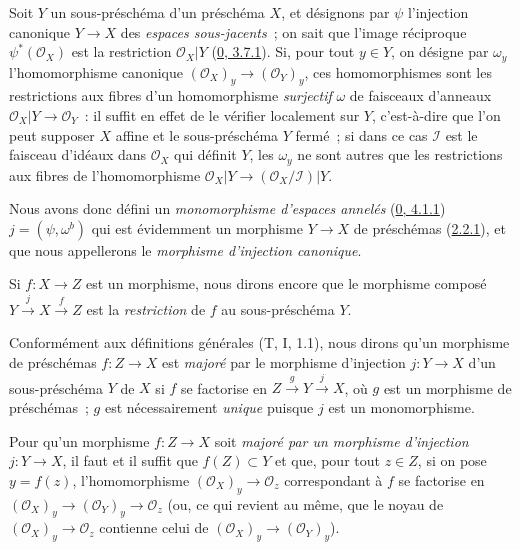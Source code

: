 \begin{env}[4.1.7]
\label{I.4.1.7-fr}
Soit $Y$ un sous-préschéma d'un préschéma $X$, et désignons par $\psi$
l'injection canonique $Y\to X$ des \emph{espaces sous-jacents}~; on sait que
l'image réciproque $\psi^*(\mathscr{O}_X)$ est la restriction
$\mathscr{O}_X|Y$ (\hyperref[0.3.7.1-fr]{0, 3.7.1}). Si, pour tout $y\in Y$,
on désigne par $\omega_y$ l'homomorphisme canonique
$(\mathscr{O}_X)_y\to(\mathscr{O}_Y)_y$, ces homomorphismes sont les
restrictions aux fibres d'un homomorphisme \emph{surjectif} $\omega$ de
faisceaux d'anneaux $\mathscr{O}_X|Y\to\mathscr{O}_Y$~: il suffit en effet de
le vérifier localement sur $Y$, c'est-à-dire que l'on peut supposer $X$
affine et le sous-préschéma $Y$ fermé~; si dans ce cas $\mathscr{I}$ est le
faisceau d'idéaux dans $\mathscr{O}_X$ qui définit $Y$, les $\omega_y$ ne sont
autres que les restrictions aux fibres de l'homomorphisme
$\mathscr{O}_X|Y\to(\mathscr{O}_X/\mathscr{I})|Y$.

Nous avons donc défini un \emph{monomorphisme d'espaces annelés}
(\hyperref[0.4.1.1-fr]{0, 4.1.1}) $j=(\psi,\omega^b)$ qui est évidemment un
morphisme $Y\to X$ de préschémas (\hyperref[I.2.2.1-fr]{2.2.1}), et que nous
appellerons le \emph{morphisme d'injection canonique}.

Si $f:X\to Z$ est un morphisme, nous dirons encore que le morphisme composé
$Y\xrightarrow{j}X\xrightarrow{f}Z$ est la \emph{restriction} de $f$ au
sous-préschéma $Y$.
\end{env}

\begin{env}[4.1.8]
\label{I.4.1.8-fr}
Conformément aux définitions générales (T, I, 1.1), nous dirons qu'un
morphisme de préschémas $f:Z\to X$ est \emph{majoré} par le morphisme
d'injection $j:Y\to X$ d'un sous-préschéma $Y$ de $X$ si $f$ se factorise en
$Z\xrightarrow{g}Y\xrightarrow{j}X$, où $g$ est un morphisme de préschémas~;
$g$ est nécessairement \emph{unique} puisque $j$ est un monomorphisme.
\end{env}

\begin{proposition}[4.1.9]
\label{I.4.1.9-fr}
Pour qu'un morphisme $f:Z\to X$ soit \emph{majoré par un morphisme
d'injection} $j:Y\to X$, il faut et il suffit que $f(Z)\subset Y$ et que,
pour tout $z\in Z$, si on pose $y=f(z)$, l'homomorphisme
$(\mathscr{O}_X)_y\to\mathscr{O}_z$ correspondant à $f$ se factorise en
$(\mathscr{O}_X)_y\to(\mathscr{O}_Y)_y\to\mathscr{O}_z$ (ou, ce qui revient
au même, que le noyau de $(\mathscr{O}_X)_y\to\mathscr{O}_z$ contienne celui
de $(\mathscr{O}_X)_y\to(\mathscr{O}_Y)_y$).
\end{proposition}


